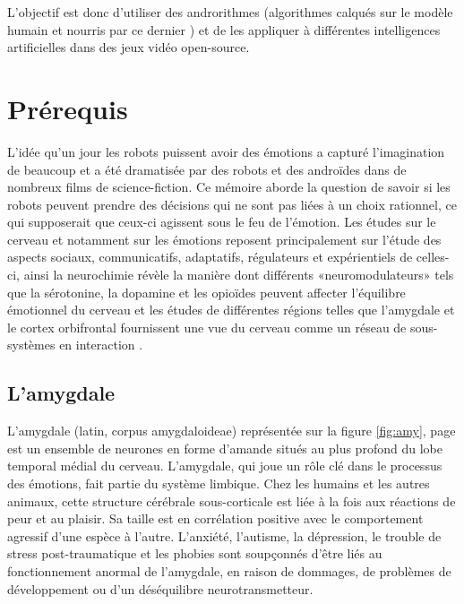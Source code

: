 L'objectif est donc d'utiliser des androrithmes (algorithmes calqués sur le modèle humain et nourris par ce dernier \parencite{humanityvstechnology}) et de les appliquer à différentes intelligences artificielles dans des jeux vidéo open-source. 



\section{Prérequis}

L'idée qu'un jour les robots puissent avoir des émotions a capturé l'imagination de beaucoup et a été dramatisée par des robots et des androïdes dans de nombreux films de science-fiction. Ce mémoire aborde la question de savoir si les robots peuvent prendre des décisions qui ne sont pas liées à un choix rationnel, ce qui supposerait que ceux-ci agissent sous le feu de l’émotion. Les études sur le cerveau et notamment sur  les émotions reposent principalement sur l’étude des aspects sociaux, communicatifs, adaptatifs, régulateurs et expérientiels de celles-ci, ainsi la neurochimie révèle la manière dont différents «neuromodulateurs» tels que la sérotonine, la dopamine et les opioïdes peuvent affecter l’équilibre émotionnel du cerveau et les études de différentes régions telles que l'amygdale et le cortex orbifrontal fournissent une vue du cerveau comme un réseau de sous-systèmes en interaction \parencite{whoneedsemotions}.



\subsection{ L'amygdale}

L'amygdale (latin, corpus amygdaloideae) représentée sur la figure \ref{fig:amy}, page \pageref{fig:amy}
est un ensemble de neurones en forme d'amande situés au plus profond du lobe temporal médial du cerveau.
L'amygdale, qui joue un rôle clé dans le processus des émotions, fait partie du système limbique.
Chez les humains et les autres animaux, cette structure cérébrale sous-corticale est liée à la fois aux réactions de peur et au plaisir.
Sa taille est en corrélation positive avec le comportement agressif d'une espèce à l'autre.
L'anxiété, l'autisme, la dépression, le trouble de stress post-traumatique et les phobies sont soupçonnés d'être liés au fonctionnement anormal de l'amygdale, en raison de dommages, de problèmes de développement ou d'un déséquilibre neurotransmetteur.

